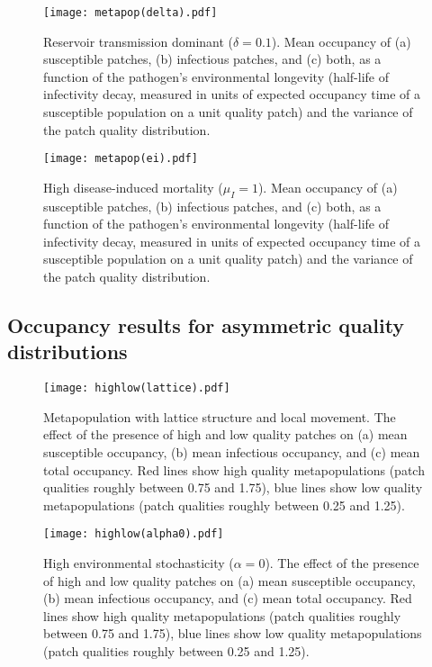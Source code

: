 \documentclass{svjour3}
\begin{document}
\begin{figure}[h!]
\centering
\texttt{[image: metapop(delta).pdf]}
\caption{Reservoir transmission dominant ($\delta = 0.1$).  Mean occupancy of (a) susceptible patches, (b) infectious patches, and (c) both, as a function of the pathogen's environmental longevity (half-life of infectivity decay, measured in units of expected occupancy time of a susceptible population on a unit quality patch) and the variance of the patch quality distribution.}
\label{poutcome_delta}
\end{figure}   

\begin{figure}[h!]
\centering
\texttt{[image: metapop(ei).pdf]}
\caption{High disease-induced mortality ($\mu_I = 1$).  Mean occupancy of (a) susceptible patches, (b) infectious patches, and (c) both, as a function of the pathogen's environmental longevity (half-life of infectivity decay, measured in units of expected occupancy time of a susceptible population on a unit quality patch) and the variance of the patch quality distribution.}
\label{poutcome_ei}
\end{figure}   

\clearpage

\subsection{Occupancy results for asymmetric quality distributions}

\begin{figure}[h!]
\centering
\texttt{[image: highlow(lattice).pdf]}
\caption{Metapopulation with lattice structure and local movement.  The effect of the presence of high and low quality patches on (a) mean susceptible occupancy, (b) mean infectious occupancy, and (c) mean total occupancy.  Red lines show high quality metapopulations (patch qualities roughly between 0.75 and 1.75), blue lines show low quality metapopulations (patch qualities roughly between 0.25 and 1.25).}
\label{sens_lattice}
\end{figure}

\begin{figure}
\centering
\texttt{[image: highlow(alpha0).pdf]}
\caption{High environmental stochasticity ($\alpha = 0$).  The effect of the presence of high and low quality patches on (a) mean susceptible occupancy, (b) mean infectious occupancy, and (c) mean total occupancy.  Red lines show high quality metapopulations (patch qualities roughly between 0.75 and 1.75), blue lines show low quality metapopulations (patch qualities roughly between 0.25 and 1.25).}
\label{sens_x0}
\end{figure}
\end{document}
